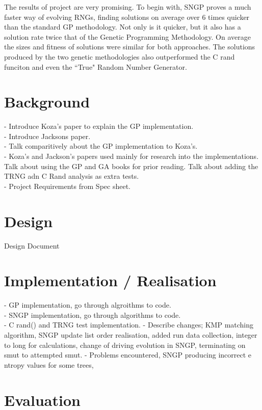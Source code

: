 \documentclass[a4paper,10.5pt]{article}
\begin{document}
The results of project are very promising. To begin with, SNGP proves a much faster way of evolving RNGs, finding solutions on average over 6 times quicker than the standard GP methodology. Not only is it quicker, but it also has a solution rate twice that of the Genetic Programming Methodology. On average the sizes and fitness of solutions were similar for both approaches. The solutions produced by the two genetic methodologies also outperformed the C rand funciton and even the ``True" Random Number Generator. 
\section{Background}
- Introduce Koza's paper to explain the GP implementation. \\
- Introduce Jacksons paper.\\
- Talk comparitively about the GP implementation to Koza's.\\
- Koza's and Jackson's papers used mainly for research into the implementations. Talk about using the GP and GA books for prior reading. Talk about adding the TRNG adn C Rand analysis as extra tests.\\
- Project Requirements from Spec sheet.

\section{Design}
Design Document

\section{Implementation / Realisation}
- GP implementation, go through algroithms to code.\\
- SNGP implementation, go through algorithms to code.\\
- C rand() and TRNG test implementation. 
- Describe changes; KMP matching algorithm, SNGP update list order realisation, added run data collection, integer to long for calculations, change of driving evolution in SNGP, terminating on smut to attempted smut. 
- Problems encountered, SNGP producing incorrect e ntropy values for some trees, 

\section{Evaluation}
\end{document}

